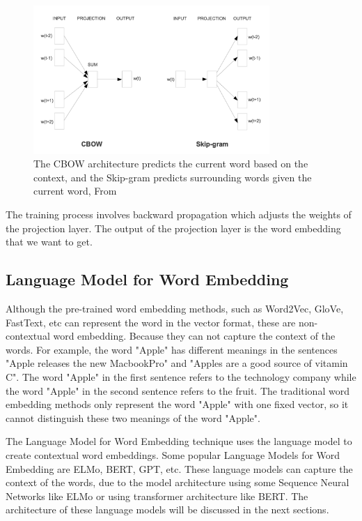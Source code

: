 \begin{figure}[ht]
    \centering
    \includegraphics[width=0.8\textwidth]{Images/5.Theoretical_Background/cbow_vs_skipgram.png}
    \caption{The CBOW architecture predicts the current word based on the context, and the Skip-gram predicts surrounding words given the current word, From \cite{word2vec-paper-publication}}
    \label{fig:cbow_vs_skipgram}
\end{figure}

The training process involves backward propagation which adjusts the weights of the projection layer. The output of the projection layer is the word embedding that we want to get.

\subsection{Language Model for Word Embedding}
Although the pre-trained word embedding methods, such as Word2Vec, GloVe, FastText, etc can represent the word in the vector format, these are non-contextual word embedding. Because they can not capture the context of the words. For example, the word "Apple" has different meanings in the sentences "Apple releases the new MacbookPro" and "Apples are a good source of vitamin C". The word "Apple" in the first sentence refers to the technology company while the word "Apple" in the second sentence refers to the fruit. The traditional word embedding methods only represent the word "Apple" with one fixed vector, so it cannot distinguish these two meanings of the word "Apple".

The Language Model for Word Embedding technique uses the language model to create contextual word embeddings. Some popular Language Models for Word Embedding are ELMo, BERT, GPT, etc. These language models can capture the context of the words, due to the model architecture using some Sequence Neural Networks like ELMo or using transformer architecture like BERT. The architecture of these language models will be discussed in the next sections.

